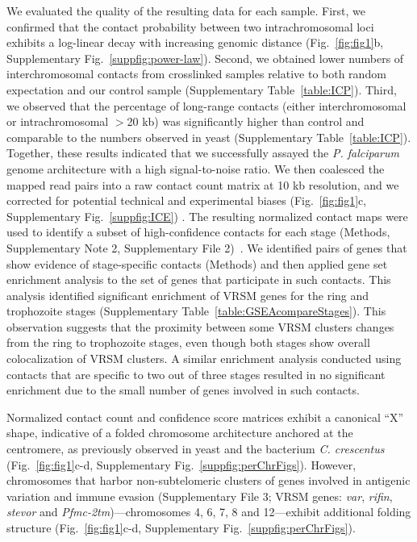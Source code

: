 We evaluated the quality of the resulting data for each sample. First, we confirmed that the contact probability between two intrachromosomal loci exhibits a log-linear decay with increasing genomic distance (Fig.~\ref{fig:fig1}b, Supplementary Fig.~\ref*{suppfig:power-law}). Second, we obtained lower numbers of interchromosomal contacts from crosslinked samples relative to both random expectation and our control sample (Supplementary Table~\ref*{table:ICP}). Third, we observed that the percentage of long-range contacts (either interchromosomal or intrachromosomal $>$20 kb) was significantly higher than control and comparable to the numbers observed in yeast \citep{duan:three-dimensional} (Supplementary Table~\ref*{table:ICP}). Together, these results indicated that we successfully assayed the {\em P. falciparum} genome architecture with a high signal-to-noise ratio. We then coalesced the mapped read pairs into a raw contact count matrix at 10 kb resolution, and we corrected for potential technical and experimental biases \citep{imakaev:iterative} (Fig.~\ref{fig:fig1}c, Supplementary Fig.~\ref*{suppfig:ICE}) . The resulting normalized contact maps were used to identify a subset of high-confidence contacts for each stage (Methods, Supplementary Note 2, Supplementary File 2)~\citep{ay:statistical}. We identified pairs of genes that show evidence of stage-specific contacts (Methods) and then applied gene set enrichment analysis to the set of genes that participate in such contacts.  This analysis identified significant enrichment of VRSM genes for the ring and trophozoite stages (Supplementary Table~\ref*{table:GSEAcompareStages}). This observation suggests that the proximity between some VRSM clusters changes from the ring to trophozoite stages, even though both stages show overall colocalization of VRSM clusters. A similar enrichment analysis conducted using contacts that are specific to two out of three stages resulted in no significant enrichment due to the small number of genes involved in such contacts.

Normalized contact count and confidence score matrices exhibit a canonical ``X'' shape, indicative of a folded chromosome architecture anchored at the centromere, as previously observed in yeast \citep{duan:three-dimensional, tanizawa:mapping} and the bacterium {\em C. crescentus} \citep{umbarger:three-dimensional} (Fig.~\ref{fig:fig1}c-d, Supplementary Fig.~\ref*{suppfig:perChrFigs}). However, chromosomes that harbor non-subtelomeric clusters of genes involved in antigenic variation and immune evasion (Supplementary File 3; VRSM genes: {\em var}, {\em rifin}, {\em stevor} and {\em Pfmc-2tm})---chromosomes 4, 6, 7, 8 and 12---exhibit additional folding structure (Fig.~\ref{fig:fig1}c-d, Supplementary Fig.~\ref*{suppfig:perChrFigs}).

